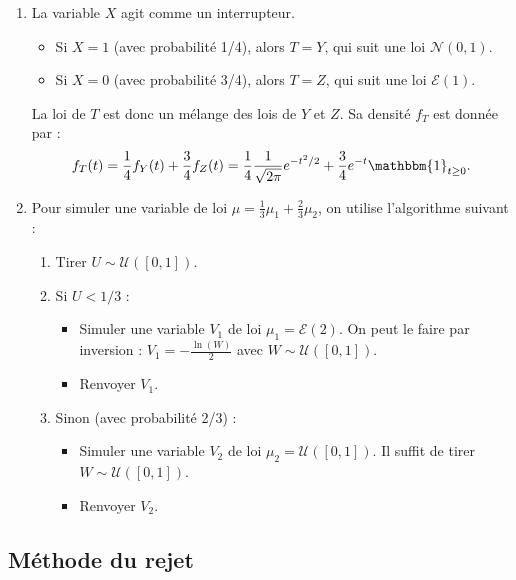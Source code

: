 \documentclass[solutions]{exercices}
\begin{document}
\begin{solution}
\begin{enumerate}
  \item La variable $X$ agit comme un interrupteur.
  \begin{itemize}
      \item Si $X=1$ (avec probabilité 1/4), alors $T=Y$, qui suit une loi $\mathcal{N}(0,1)$.
      \item Si $X=0$ (avec probabilité 3/4), alors $T=Z$, qui suit une loi $\mathcal{E}(1)$.
  \end{itemize}
  La loi de $T$ est donc un mélange des lois de $Y$ et $Z$. Sa densité $f_T$ est donnée par :
  \[ f_T(t) = \frac{1}{4} f_Y(t) + \frac{3}{4} f_Z(t) = \frac{1}{4} \frac{1}{\sqrt{2\pi}}e^{-t^2/2} + \frac{3}{4} e^{-t} \mathbbm{1}_{t \ge 0}. \]
  \item Pour simuler une variable de loi $\mu = \frac{1}{3}\mu_1+\frac{2}{3}\mu_2$, on utilise l'algorithme suivant :
  \begin{enumerate}
      \item Tirer $U \sim \mathcal{U}([0,1])$.
      \item Si $U < 1/3$ :
        \begin{itemize}
            \item Simuler une variable $V_1$ de loi $\mu_1 = \mathcal{E}(2)$. On peut le faire par inversion : $V_1 = -\frac{\ln(W)}{2}$ avec $W \sim \mathcal{U}([0,1])$.
            \item Renvoyer $V_1$.
        \end{itemize}
      \item Sinon (avec probabilité 2/3) :
        \begin{itemize}
            \item Simuler une variable $V_2$ de loi $\mu_2 = \mathcal{U}([0,1])$. Il suffit de tirer $W \sim \mathcal{U}([0,1])$.
            \item Renvoyer $V_2$.
        \end{itemize}
  \end{enumerate}
\end{enumerate}
\end{solution}

\subsection*{Méthode du rejet}
\end{document}
